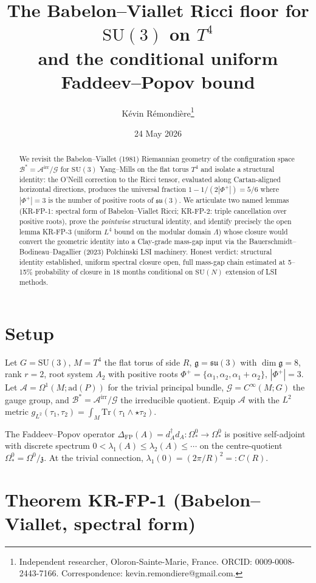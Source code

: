 \documentclass[11pt]{article}
\title{The Babelon--Viallet Ricci floor for $\mathrm{SU}(3)$ on $T^4$ \\
and the conditional uniform Faddeev--Popov bound}
\author{Kévin Rémondière\thanks{Independent researcher, Oloron-Sainte-Marie, France. ORCID: 0009-0008-2443-7166. Correspondence: kevin.remondiere@gmail.com.}}
\date{24 May 2026}
\begin{document}
\maketitle

\begin{abstract}
We revisit the Babelon--Viallet (1981) Riemannian geometry of the configuration space $\mathcal{B}^*=\mathcal{A}^{\mathrm{irr}}/\mathcal{G}$ for $\mathrm{SU}(3)$ Yang--Mills on the flat torus $T^4$ and isolate a structural identity: the O'Neill correction to the Ricci tensor, evaluated along Cartan-aligned horizontal directions, produces the universal fraction $1-1/(2|\Phi^+|)=5/6$ where $|\Phi^+|=3$ is the number of positive roots of $\mathfrak{su}(3)$. We articulate two named lemmas (KR-FP-1: spectral form of Babelon--Viallet Ricci; KR-FP-2: triple cancellation over positive roots), prove the \emph{pointwise} structural identity, and identify precisely the open lemma KR-FP-3 (uniform $L^4$ bound on the modular domain $\Lambda$) whose closure would convert the geometric identity into a Clay-grade mass-gap input via the Bauerschmidt--Bodineau--Dagallier (2023) Polchinski LSI machinery. Honest verdict: structural identity established, uniform spectral closure open, full mass-gap chain estimated at 5--15\% probability of closure in 18 months conditional on $\mathrm{SU}(N)$ extension of LSI methods.
\end{abstract}

\section{Setup}
Let $G=\mathrm{SU}(3)$, $M=T^4$ the flat torus of side $R$, $\mathfrak{g}=\mathfrak{su}(3)$ with $\dim\mathfrak{g}=8$, rank $r=2$, root system $A_2$ with positive roots $\Phi^+=\{\alpha_1,\alpha_2,\alpha_1+\alpha_2\}$, $|\Phi^+|=3$. Let $\mathcal{A}=\Omega^1(M;\mathrm{ad}(P))$ for the trivial principal bundle, $\mathcal{G}=C^\infty(M;G)$ the gauge group, and $\mathcal{B}^*=\mathcal{A}^{\mathrm{irr}}/\mathcal{G}$ the irreducible quotient. Equip $\mathcal{A}$ with the $L^2$ metric $g_{L^2}(\tau_1,\tau_2)=\int_M\mathrm{Tr}(\tau_1\wedge\star\tau_2)$.

The Faddeev--Popov operator $\Delta_{\mathrm{FP}}(A)=d_A^\dagger d_A:\Omega^0_*\to\Omega^0_*$ is positive self-adjoint with discrete spectrum $0<\lambda_1(A)\leq\lambda_2(A)\leq\cdots$ on the centre-quotient $\Omega^0_*=\Omega^0/\mathfrak{z}$. At the trivial connection, $\lambda_1(0)=(2\pi/R)^2=:C(R)$.

\section{Theorem KR-FP-1 (Babelon--Viallet, spectral form)}
\end{document}
